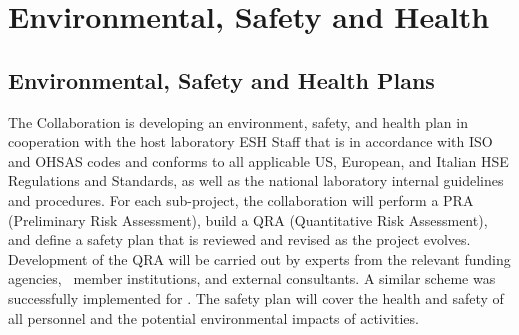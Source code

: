 \section{Environmental, Safety and Health}

\subsection{Environmental, Safety and Health Plans}

The Collaboration is developing an environment, safety, and health plan in cooperation with the host laboratory ESH Staff that is in accordance with ISO and OHSAS codes and conforms to all applicable US, European, and Italian HSE Regulations and Standards, as well as the national laboratory internal guidelines and procedures. For each sub-project, the collaboration will perform a PRA (Preliminary Risk Assessment), build a QRA (Quantitative Risk Assessment), and define a safety plan that is reviewed and revised as the project evolves. Development of the QRA will be carried out by experts from the relevant funding agencies, \GADMC\ member institutions, and external consultants. A similar scheme was successfully implemented for \DSf. The safety plan will cover the health and safety of all personnel and the potential environmental impacts of activities. 



